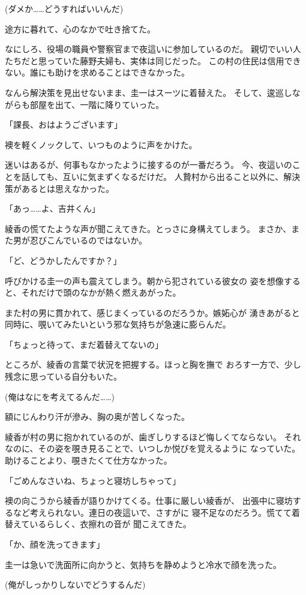 ﻿\documentclass[
    book,tate,
    line_length=30zw,
    jafontsize=12pt,
    paper=b5j,
    landscape,
    ]{jlreq}
\begin{document}
(ダメか……どうすればいいんだ)

途方に暮れて、心のなかで吐き捨てた。

なにしろ、役場の職員や警察官まで夜這いに参加しているのだ。
親切でいい人たちだと思っていた藤野夫婦も、実体は同じだった。
この村の住民は信用できない。誰にも助けを求めることはできなかった。

なんら解決策を見出せないまま、圭一はスーツに着替えた。
そして、逡巡しながらも部屋を出て、一階に降りていった。

「課長、おはようございます」

襖を軽くノックして、いつものように声をかけた。

迷いはあるが、何事もなかったように接するのが一番だろう。
今、夜這いのことを話しても、互いに気まずくなるだけだ。
人贄村から出ること以外に、解決策があるとは思えなかった。

「あっ……よ、吉井くん」

綾香の慌てたような声が聞こえてきた。とっさに身構えてしまう。
まさか、また男が忍びこんでいるのではないか。

「ど、どうかしたんですか？」

呼びかける圭一の声も震えてしまう。朝から犯されている彼女の
姿を想像すると、それだけで頭のなかが熱く燃えあがった。

また村の男に貫かれて、感じまくっているのだろうか。嫉妬心が
湧きあがると同時に、覗いてみたいという邪な気持ちが急速に膨らんだ。

「ちょっと待って、まだ着替えてないの」

ところが、綾香の言葉で状況を把握する。ほっと胸を撫で
おろす一方で、少し残念に思っている自分もいた。

(俺はなにを考えてるんだ……)

額にじんわり汗が滲み、胸の奥が苦しくなった。

綾香が村の男に抱かれているのが、歯ぎしりするほど悔しくてならない。
それなのに、その姿を覗き見ることで、いつしか悦びを覚えるように
なっていた。助けることより、覗きたくて仕方なかった。

「ごめんなさいね、ちょっと寝坊しちゃって」

襖の向こうから綾香が語りかけてくる。仕事に厳しい綾香が、
出張中に寝坊するなど考えられない。連日の夜這いで、さすがに
寝不足なのだろう。慌てて着替えているらしく、衣擦れの音が
聞こえてきた。

「か、顔を洗ってきます」

圭一は急いで洗面所に向かうと、気持ちを静めようと冷水で顔を洗った。

(俺がしっかりしないでどうするんだ)
\end{document}
